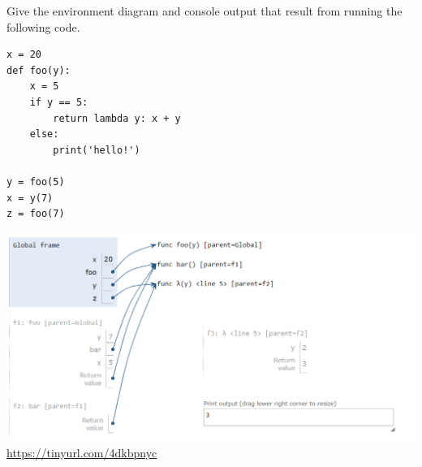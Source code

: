 \begin{blocksection}
\question Give the environment diagram and console output that result from running the following code.

\begin{lstlisting}
x = 20
def foo(y):
    x = 5
    if y == 5:
        return lambda y: x + y
    else:
        print('hello!')

y = foo(5)
x = y(7)
z = foo(7)
\end{lstlisting}

\begin{solution}[2in]
\includegraphics[scale=0.5]{foobar.png}
\\
\url{https://tinyurl.com/4dkbpnyc}
\end{solution}
\end{blocksection}